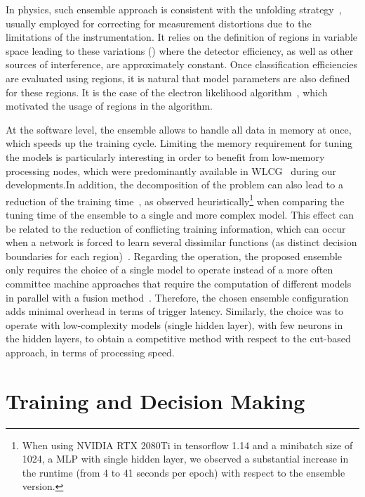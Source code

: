 In physics, such ensemble approach is consistent with the unfolding
strategy~\cite{Cowan1998}, usually employed for correcting for
measurement distortions due to the limitations of the instrumentation. It relies
on the definition of regions in variable space leading to these
variations (\eteta{}) where the detector efficiency, as well as other
sources of interference, are approximately constant. Once classification
efficiencies are evaluated using regions, it is natural that model parameters
are also defined for these regions. It is the case of the electron likelihood
algorithm~\cite{atlas_electron_id_offline}, which motivated the usage of
\eteta{} regions in the \rnn{} algorithm.

At the software level, the ensemble allows to handle all data in memory at once,
which speeds up the training cycle. Limiting the memory requirement for tuning
the models is particularly interesting in order to benefit from low-memory 
 processing nodes, which were predominantly available in 
WLCG~\cite{2015_lcg_tdr} during our
developments.\@ In addition, the decomposition of the problem can also lead to a
reduction of the training time~\cite{Polikar2006}, as observed heuristically\footnote{
  When using NVIDIA RTX 2080Ti in tensorflow 1.14 and a minibatch size of 1024, a 
  MLP with single hidden layer, we observed a substantial increase in the runtime (from 4 
  to 41 seconds per epoch) with respect to the ensemble version.} when
comparing the tuning time of the ensemble to a single and more complex model.
This effect can be related to the reduction of conflicting training information,
which can occur when a network is forced to learn several dissimilar functions
(as distinct decision boundaries for each region)~\cite{Auda1999,haykin_2008}.
Regarding the operation, the proposed ensemble only requires the choice of a
single model to operate instead of a more often committee machine approaches
that require the computation of different models in parallel with a fusion
method~\cite{zhou_ensemble}.  Therefore, the chosen ensemble configuration adds
minimal overhead in terms of trigger latency. Similarly, the choice was to
operate with low-complexity models (single hidden layer), with few neurons in
the hidden layers, to obtain a competitive method with respect to the cut-based
approach, in terms of processing speed.



\section{Training and Decision Making}%
\label{sec:tuning}

